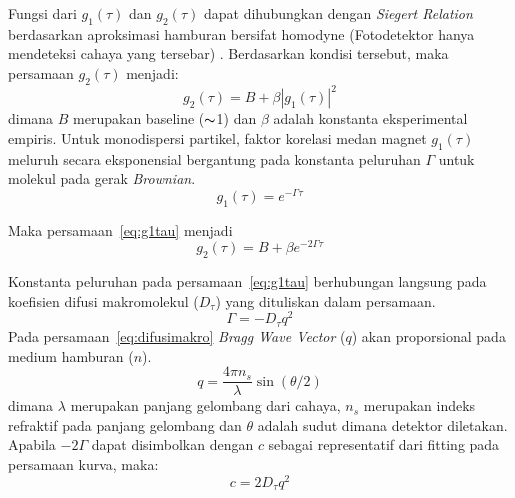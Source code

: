 
Fungsi dari ${g_1(\tau)}$ dan ${g_2(\tau)}$ dapat dihubungkan dengan \textit{Siegert Relation}
\cite{Siegert1943}
berdasarkan aproksimasi hamburan bersifat homodyne (Fotodetektor hanya mendeteksi cahaya
yang tersebar) \cite{Stetefeld2016}. Berdasarkan kondisi tersebut, maka persamaan
${g_2(\tau)}$ menjadi:
\begin{equation}
    g_2(\tau) = B + \beta|g_1(\tau)|^2
    \label{eq:g_2fin}
\end{equation}
\noindent
dimana ${B}$ merupakan baseline (${\thicksim}$1) dan ${\beta}$ adalah konstanta eksperimental empiris.
Untuk monodispersi partikel, faktor korelasi medan magnet ${g_1(\tau)}$ meluruh secara
eksponensial bergantung pada konstanta peluruhan ${\Gamma}$ untuk molekul pada gerak
\textit{Brownian}.
\begin{equation}
    g_1(\tau)=e^{-\Gamma \tau}
    \label{eq:g1tau}
\end{equation}

\noindent
Maka persamaan~\ref{eq:g1tau} menjadi
\begin{equation}
    g_2(\tau) = B + \beta e^{-2\Gamma \tau}
\end{equation}

Konstanta peluruhan pada persamaan~\ref{eq:g1tau} berhubungan langsung pada koefisien difusi
makromolekul (${D_{\tau}}$) yang dituliskan dalam persamaan.
\begin{equation}
    \Gamma = -D_{\tau} q^2
    \label{eq:difusimakro}
\end{equation}
\noindent
Pada persamaan~\ref{eq:difusimakro} \textit{Bragg Wave Vector} (${q}$) akan proporsional pada
medium hamburan (${n}$).
\begin{equation}
    q = \frac{4\pi n_s}{\lambda} \sin (\theta / 2)
    \label{eq:q}
\end{equation}
\noindent
dimana ${\lambda}$ merupakan panjang gelombang dari cahaya, ${n_s}$ merupakan indeks refraktif
pada panjang gelombang dan ${\theta}$ adalah sudut dimana
detektor diletakan. Apabila ${-2 \Gamma}$ dapat disimbolkan dengan ${c}$ sebagai representatif
dari fitting pada persamaan kurva, maka:
\begin{equation}
    c = 2 D_{\tau} q^2
    \label{eq:c}
\end{equation}

